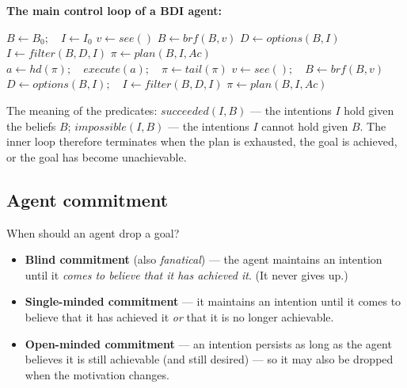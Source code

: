 \documentclass[11pt,a4paper]{article}
\theoremstyle{definition}
\begin{document}
\noindent\textbf{The main control loop of a BDI agent:}
\begin{algorithmic}[1]
\State $B \gets B_0;\quad I \gets I_0$
  \State $v \gets \mathit{see}()$
  \State $B \gets \mathit{brf}(B,v)$
  \State $D \gets \mathit{options}(B,I)$
  \State $I \gets \mathit{filter}(B,D,I)$
  \State $\pi \gets \mathit{plan}(B,I,\mathit{Ac})$
    \State $a \gets \mathit{hd}(\pi);\quad \mathit{execute}(a);\quad \pi \gets \mathit{tail}(\pi)$
    \State $v \gets \mathit{see}();\quad B \gets \mathit{brf}(B,v)$
      \State $D \gets \mathit{options}(B,I);\quad I \gets \mathit{filter}(B,D,I)$
    \EndIf
      \State $\pi \gets \mathit{plan}(B,I,\mathit{Ac})$ 
    \EndIf
  \EndWhile
\EndWhile
\end{algorithmic}

The meaning of the predicates: $\mathit{succeeded}(I,B)$ --- the intentions $I$ hold given the
beliefs $B$; $\mathit{impossible}(I,B)$ --- the intentions $I$ cannot hold given $B$.
The inner loop therefore terminates when the plan is exhausted, the goal is achieved, or the goal
has become unachievable.

\subsection{Agent commitment}
\label{ssec:commitment}

\begin{defbox}
When should an agent drop a goal?
\begin{itemize}
\item \textbf{Blind commitment} (also \emph{fanatical}) --- the agent maintains an intention until
  it \emph{comes to believe that it has achieved it}. (It never gives up.)
\item \textbf{Single-minded commitment} --- it maintains an intention until it comes to believe
  that it has achieved it \emph{or} that it is no longer achievable.
\item \textbf{Open-minded commitment} --- an intention persists as long as the agent believes it is
  still achievable (and still desired) --- so it may also be dropped when the motivation changes.
\end{itemize}
\end{defbox}
\end{document}
